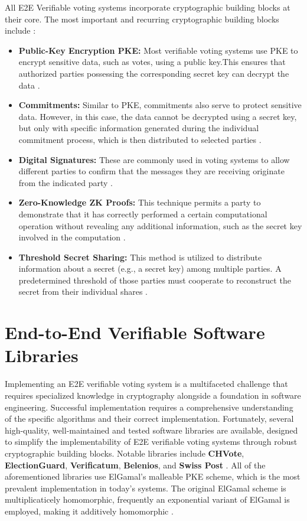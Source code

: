 All \ac{E2E} Verifiable voting systems incorporate cryptographic building blocks at their core. The most important and recurring cryptographic building blocks include \cite[13]{stuve-study}:
\begin{itemize}
    \item \textbf{Public-Key Encryption \ac{PKE}:} Most verifiable voting systems use \ac{PKE} to encrypt sensitive data, such as votes, using a public key.This ensures that authorized parties possessing the corresponding secret key can decrypt the data \cite[13]{stuve-study}.
    \item \textbf{Commitments:} Similar to \ac{PKE}, commitments also serve to protect sensitive data. However, in this case, the data cannot be decrypted using a secret key, but only with specific information generated during the individual commitment process, which is then distributed to selected parties \cite[13]{stuve-study}.
    \item \textbf{Digital Signatures:} These are commonly used in voting systems to allow different parties to confirm that the messages they are receiving originate from the indicated party \cite[13]{stuve-study}.
    \item \textbf{Zero-Knowledge \ac{ZK} Proofs:} This technique permits a party to demonstrate that it has correctly performed a certain computational operation without revealing any additional information, such as the secret key involved in the computation \cite[13]{stuve-study}.
    \item \textbf{Threshold Secret Sharing:} This method is utilized to distribute information about a secret (e.g., a secret key) among multiple parties. A predetermined threshold of those parties must cooperate to reconstruct the secret from their individual shares \cite[13]{stuve-study}.
\end{itemize}

\section{End-to-End Verifiable Software Libraries}
Implementing an \ac{E2E} verifiable voting system is a multifaceted challenge that requires specialized knowledge in cryptography alongside a foundation in software engineering. Successful implementation requires a comprehensive understanding of the specific algorithms and their correct implementation. Fortunately, several high-quality, well-maintained and tested software libraries are available, designed to simplify the implementability of \ac{E2E} verifiable voting systems through robust cryptographic building blocks. Notable libraries include \textbf{CHVote}, \textbf{ElectionGuard}, \textbf{Verificatum}, \textbf{Belenios}, and \textbf{Swiss Post} \cite[11, 26]{stuve-study}. All of the aforementioned libraries use ElGamal's malleable \ac{PKE} scheme, which is the most prevalent implementation in today's systems. The original ElGamal scheme is multiplicaticely homomorphic, frequently an exponential variant of ElGamal is employed, making it additively homomorphic \cite[40]{stuve-study}.

